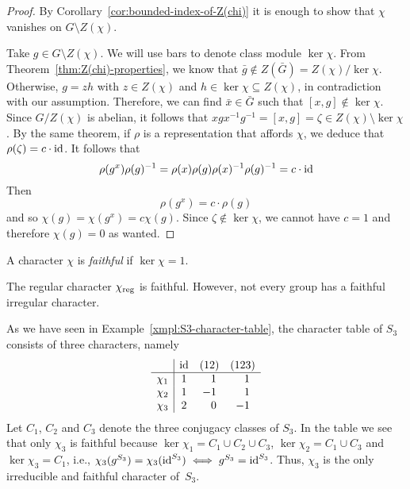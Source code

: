 \begin{proof}
    By Corollary~\ref{cor:bounded-index-of-Z(chi)} it is enough to show that $\chi$ vanishes on $G\setminus Z(\chi)$.

    Take $g\in G\setminus Z(\chi)$. We will use bars to denote class module $\ker\chi$. From Theorem~\ref{thm:Z(chi)-properties}, we know that $\bar g\notin Z(\bar G)=Z(\chi)/\ker\chi$. Otherwise, $g=z h$ with $z\in Z(\chi)$ and $h\in\ker\chi\subseteq Z(\chi)$, in contradiction with our assumption. Therefore, we can find $\bar x\in\bar G$ such that $[x,g]\notin\ker\chi$. Since $G/Z(\chi)$ is abelian, it follows that $xgx^{-1}g^{-1} = [x,g] = \zeta\in Z(\chi)\setminus\ker\chi$. By the same theorem, if $\rho$ is a representation that affords $\chi$, we deduce that $\rho(\zeta)=c\cdot\operatorname{id}$. It follows that
    $$
        \rho(g^x)\rho(g)^{-1}
            = \rho(x)\rho(g)\rho(x)^{-1}\rho(g)^{-1}
            = c\cdot\operatorname{id}
    $$
    Then
    $$
        \rho(g^x)=c\cdot\rho(g)
    $$
    and so $\chi(g)=\chi(g^x)=c\chi(g)$. Since $\zeta\notin\ker\chi$, we cannot have $c=1$ and therefore $\chi(g)=0$ as wanted.
\end{proof}

\begin{defn}
    A character $\chi$ is \textsl{faithful} if $\ker\chi=1$.
\end{defn}

\begin{rem}
    The regular character $\chi_{\mathrm{reg}}$ is faithful. However, not every group has a faithful irregular character.
\end{rem}

\begin{xmpl}
    As we have seen in Example~\ref{xmpl:S3-character-table}, the character table of $S_3$ consists of three characters,
    namely
    $$
        \begin{array}{c|ccc}
                & \id & (12) & (123) \\ \hline
            \chi_1 & 1 & \phantom-1 & \phantom-1 \\
            \chi_2 & 1 & -1 & \phantom-1 \\
            \chi_3 & 2 & \phantom-0 & -1
    \end{array}
    $$
    Let $C_1$, $C_2$ and $C_3$ denote the three conjugacy classes of $S_3$. In the table we see that only $\chi_3$ is faithful because $\ker\chi_1=C_1\cup C_2\cup C_3$, $\ker\chi_2=C_1\cup C_3$ and $\ker\chi_3=C_1$, i.e., $\chi_3(g^{S_3})=\chi_3(\operatorname{id}^{S_3})\iff g^{S_3}=\operatorname{id}^{S_3}$. Thus, $\chi_3$ is the only irreducible and faithful character of~$S_3$.
\end{xmpl}

